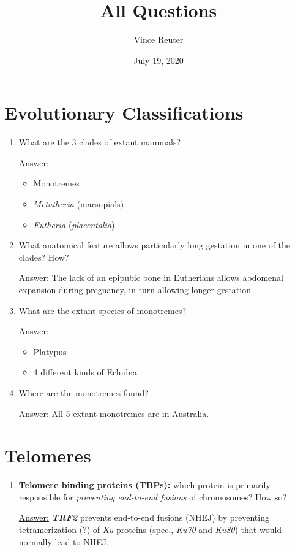 \documentclass{article}
\title{All Questions}
\author{Vince Reuter}
\date{July 19, 2020}
\newenvironment{QandA}{\begin{enumerate}[label=\bfseries Q\arabic*.]}
                       {\end{enumerate}}
\newenvironment{answered}{\par\normalfont\underline{Answer:}}{}
\begin{document}
\maketitle

\section{Evolutionary Classifications}
\begin{QandA}
  \item{What are the 3 clades of extant mammals?}
    \begin{answered}
    \begin{itemize}
      \item{Monotremes}
      \item{\textit{Metatheria} (marsupials)}
      \item{\textit{Eutheria} (\textit{placentalia})}
    \end{itemize}
    \end{answered}
  \item{What anatomical feature allows particularly long gestation in one of the clades? How?}
    \begin{answered}
    The lack of an epipubic bone in Eutherians allows abdomenal expansion during pregnancy, in turn allowing longer gestation
    \end{answered}
  \item{What are the extant species of monotremes?}
    \begin{answered}
    \begin{itemize}
      \item{Platypus}
      \item{4 different kinds of Echidna}
    \end{itemize}
    \end{answered}
  \item{Where are the monotremes found?}
    \begin{answered}
    All 5 extant monotremes are in Australia.
    \end{answered}
\end{QandA}
\section{Telomeres}
\begin{QandA}
  \item{\textbf{Telomere binding proteins (TBPs):} which protein is primarily responsible for \textit{preventing end-to-end fusions} of chromosomes? How so?}
    \begin{answered}
    \textbf{\textit{TRF2}} prevents end-to-end fusions (NHEJ) by preventing tetramerization (?) of \textit{Ku} proteins (spec., \textit{Ku70} and \textit{Ku80}) that would normally lead to NHEJ.
    \end{answered}
\end{QandA}
\end{document}
